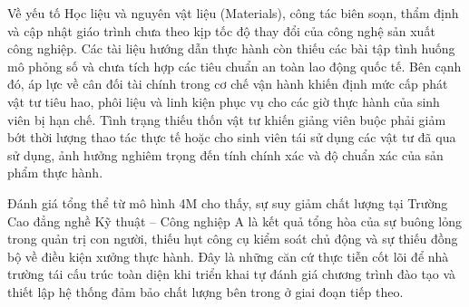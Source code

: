 Về yếu tố Học liệu và nguyên vật liệu (Materials), công tác biên soạn, thẩm định và cập nhật giáo trình chưa theo kịp tốc độ thay đổi của công nghệ sản xuất công nghiệp. Các tài liệu hướng dẫn thực hành còn thiếu các bài tập tình huống mô phỏng số và chưa tích hợp các tiêu chuẩn an toàn lao động quốc tế. Bên cạnh đó, áp lực về cân đối tài chính trong cơ chế vận hành khiến định mức cấp phát vật tư tiêu hao, phôi liệu và linh kiện phục vụ cho các giờ thực hành của sinh viên bị hạn chế. Tình trạng thiếu thốn vật tư khiến giảng viên buộc phải giảm bớt thời lượng thao tác thực tế hoặc cho sinh viên tái sử dụng các vật tư đã qua sử dụng, ảnh hưởng nghiêm trọng đến tính chính xác và độ chuẩn xác của sản phẩm thực hành.

\enlargethispage{\baselineskip}
Đánh giá tổng thể từ mô hình 4M cho thấy, sự suy giảm chất lượng tại Trường Cao đẳng nghề Kỹ thuật -- Công nghiệp A là kết quả tổng hòa của sự buông lỏng trong quản trị con người, thiếu hụt công cụ kiểm soát chủ động và sự thiếu đồng bộ về điều kiện xưởng thực hành. Đây là những căn cứ thực tiễn cốt lõi để nhà trường tái cấu trúc toàn diện khi triển khai tự đánh giá chương trình đào tạo và thiết lập hệ thống đảm bảo chất lượng bên trong ở giai đoạn tiếp theo.
